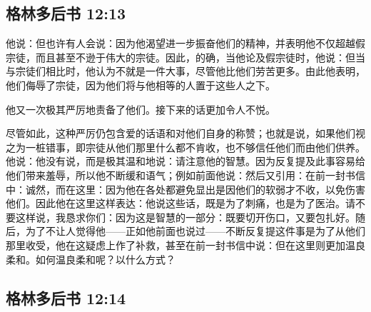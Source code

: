 \subsection{格林多后书 12:13}

\par

他说：但也许有人会说：因为他渴望进一步振奋他们的精神，并表明他不仅超越假宗徒，而且甚至不逊于伟大的宗徒。因此，的确，当他论及假宗徒时，他说：但当与宗徒们相比时，他认为不就是一件大事，尽管他比他们劳苦更多。由此他表明，他们侮辱了宗徒，因为他们将与他相等的人置于这些人之下。\par

他又一次极其严厉地责备了他们。接下来的话更加令人不悦。\par

尽管如此，这种严厉仍包含爱的话语和对他们自身的称赞；也就是说，如果他们视之为一桩错事，即宗徒从他们那里什么都不肯收，也不够信任他们而由他们供养。他说：他没有说，而是极其温和地说：请注意他的智慧。因为反复提及此事容易给他们带来羞辱，所以他不断缓和语气；例如前面他说：然后又引用：在前一封书信中：诚然，而在这里：因为他在各处都避免显出是因他们的软弱才不收，以免伤害他们。因此他在这里这样表达：他说这些话，既是为了刺痛，也是为了医治。请不要这样说，我恳求你们：因为这是智慧的一部分：既要切开伤口，又要包扎好。随后，为了不让人觉得他——正如他前面也说过——不断反复提这件事是为了从他们那里收受，他在这疑虑上作了补救，甚至在前一封书信中说：但在这里则更加温良柔和。如何温良柔和呢？以什么方式？\par


\subsection{格林多后书 12:14}

